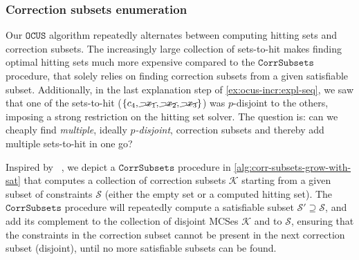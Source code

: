 \documentclass[twoside,11pt]{article}
\newcommand\citet[1]{\citeauthor{#1}~\citeyear{#1}}
\newcommand\m[1]{\mathcal{#1}}
\newcommand\comment[1]{\marginpar{\tiny #1}}
\renewcommand\comment[1]{#1}
\newcommand{\tias}[1]{{\comment{\color{blue}Tias:#1}}}
\newcommand{\bart}[1]{{\comment{\color{OliveGreen}Bart: #1}}}
\newcommand\subsetT{\ensuremath{\m{S} }\xspace}
\newcommand\formula{\ensuremath{\m{F} }\xspace}
\newcommand\mm[1]{\ensuremath{#1}\xspace}
\newcommand\call[1]{\mm{\texttt{#1}}}
\newcommand\sat{\texttt{{SAT}}\xspace}
\newcommand\grow{\mm{\call{Grow}}}
\newcommand\comus{\mm{\call{OCUS}}}
\newcommand\corrsubsets{\mm{\call{CorrSubsets}}}
\begin{document}
\subsubsection{Correction subsets enumeration}\label{sec:correction_subset_enum}
Our \comus algorithm repeatedly alternates between computing hitting sets and correction subsets. 
The increasingly large collection of sets-to-hit makes finding optimal hitting sets much more expensive compared to the \corrsubsets procedure, that solely relies on finding correction subsets from a given satisfiable subset.
Additionally, in the last explanation step of \cref{ex:ocus-incr:expl-seq}, we saw that one of the sets-to-hit ($\{c_4, \cancel{\lnot x_1} ,\cancel{\lnot x_2} , \cancel{\lnot x_3}\}$) was $p$-disjoint to the others, imposing a strong restriction on the hitting set solver. 
The question is: can we cheaply find \textit{multiple}, ideally \emph{$p$-disjoint}, correction subsets and thereby add multiple sets-to-hit in one go?


Inspired by \citet{marques2013computing}, we depict a \corrsubsets procedure
in \cref{alg:corr-subsets-grow-with-sat} that computes a collection of correction subsets $\m{K}$ starting from a given subset of constraints $\m{S}$ (either the empty set or a computed hitting set). 
The \corrsubsets procedure will repeatedly compute a satisfiable subset $\m{S}' \supseteq \m{S}$, and add its complement 
to the collection of disjoint MCSes $\m{K}$ and to $\m{S}$, ensuring that the constraints in the correction subset cannot be present in the next correction subset (disjoint), until no more satisfiable subsets can be found. 

%	
\end{document}
